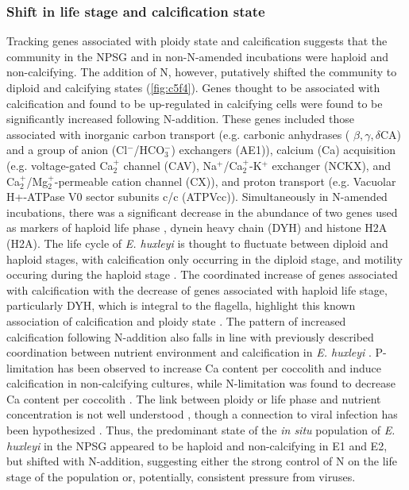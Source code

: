 \subsubsection{Shift in life stage and calcification state}

Tracking genes associated with ploidy state and calcification suggests that the community in the NPSG and in non-N-amended incubations were haploid and non-calcifying. The addition of N, however, putatively shifted the community to diploid and calcifying states (\cref{fig:c5f4}). Genes thought to be associated with calcification \citep{Mackinder2010} and found to be up-regulated in calcifying cells \citep{Mackinder2011} were found to be significantly increased following N-addition. These genes included those associated with inorganic carbon transport (e.g. carbonic anhydrases ( $\beta, \gamma, \delta$CA) and a group of anion (Cl$^-$/HCO$_{3}^-$) exchangers (AE1)), calcium (Ca) acquisition (e.g. voltage-gated Ca$_{2}^+$ channel (CAV), Na$^+$/Ca$_{2}^+$-K$^+$ exchanger (NCKX), and Ca$_{2}^+$/Mg$_{2}^+$-permeable cation channel (CX)), and proton transport (e.g. Vacuolar H+-ATPase V0 sector subunits c/c (ATPVcc)). Simultaneously in N-amended incubations, there was a significant decrease in the abundance of two genes used as markers of haploid life phase \citep{Frada2012}, dynein heavy chain (DYH) and histone H2A (H2A). The life cycle of \textit{E. huxleyi} is thought to fluctuate between diploid and haploid stages, with calcification only occurring in the diploid stage, and motility occuring during the haploid stage \citep{Paasche2001}. The coordinated increase of genes associated with calcification with the decrease of genes associated with haploid life stage, particularly DYH, which is integral to the flagella, highlight this known association of calcification and ploidy state \citep{Frada2012}. The pattern of increased calcification following N-addition also falls in line with previously described coordination between nutrient environment and calcification in \textit{E. huxleyi} \citep{Paasche2001}. P-limitation has been observed to increase Ca content per coccolith and induce calcification in non-calcifying cultures, while N-limitation was found to decrease Ca content per coccolith \citep{Paasche1994, Paasche1998}. The link between ploidy or life phase and nutrient concentration is not well understood \citep{Green1996}, though a connection to viral infection has been hypothesized \citep{Frada2008}. Thus, the predominant state of the \textit{in situ} population of \textit{E. huxleyi} in the NPSG appeared to be haploid and non-calcifying in E1 and E2, but shifted with N-addition, suggesting either the strong control of N on the life stage of the population or, potentially, consistent pressure from viruses.

